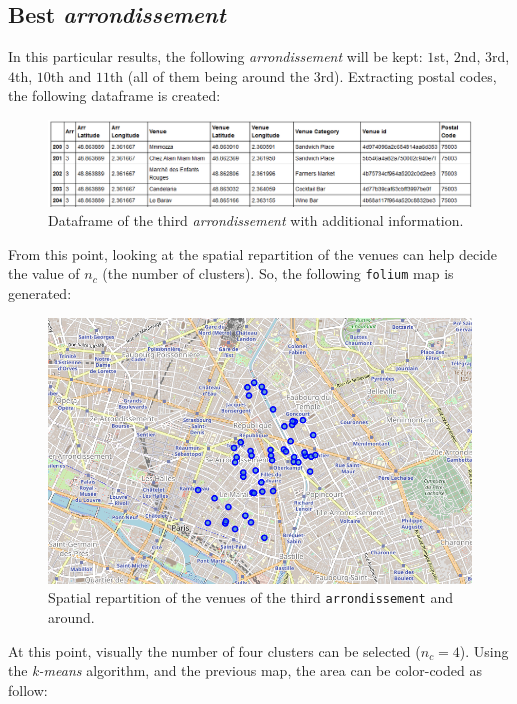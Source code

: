 \documentclass[english]{article}
\begin{document}
	\subsection{Best \textit{arrondissement}}
	In this particular results, the following \textit{arrondissement} will be kept: $1$st, $2$nd, $3$rd, $4$th, $10$th and $11$th (all of them being around the $3$rd). Extracting postal codes, the following dataframe is created:
	\begin{figure}[h]
		\centering
		\includegraphics[width=\linewidth,keepaspectratio]{Figures/DataFraleThird}
		\caption{Dataframe of the third \textit{arrondissement} with additional information.}
		\label{DataFramesThird}
	\end{figure}
	From this point, looking at the spatial repartition of the venues can help decide the value of $n_c$ (the number of clusters). So, the following \texttt{folium} map is generated:
	\begin{figure}[h!]
		\centering
		\includegraphics[width=0.60\linewidth,keepaspectratio]{Figures/FoliumUnclustered}
		\caption{Spatial repartition of the venues of the third \texttt{arrondissement} and around.}
		\label{FoliumMap}
	\end{figure}
	At this point, visually the number of four clusters can be selected ($n_c = 4$). Using the \textit{k-means} algorithm, and the previous map, the area can be color-coded as follow:
\end{document}
